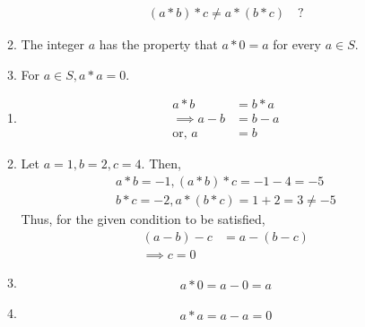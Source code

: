 \begin{enumerate}[label=\arabic*.,ref=\thesubsection.\theenumi]
\begin{enumerate}
		\begin{align}
(a*b)*c \ne a*(b*c) \quad ?
		\end{align}
	\item The integer $a$ has the property that $a*0 = a$ for every $a \in S$.
	\item For $a \in S, a*a = 0$. 
		\end{enumerate}
		\solution 
				\begin{enumerate}
					\item 
		\begin{align}
			a*b &=  b*a 
\\
			\implies a-b &= b-a
			\\
			\text{or, } a &= b
		\end{align}
	\item Let $a = 1, b = 2, c = 4$.  Then, 
		\begin{align}
			a*b = -1, (a*b)*c = -1-4 = -5
			\\
			b*c = -2, a*(b*c) = 1 +2 = 3 \ne -5
		\end{align}
		Thus, for the given condition to be satisfied, 
		\begin{align}
			(a-b)-c &= a - (b-c)
			\\
			\implies c = 0
		\end{align}
	\item 
		\begin{align}
			a*0 = a-0 = a
		\end{align}
	\item 
		\begin{align}
			a*a = a - a = 0
		\end{align}


\end{enumerate}
\end{enumerate}
